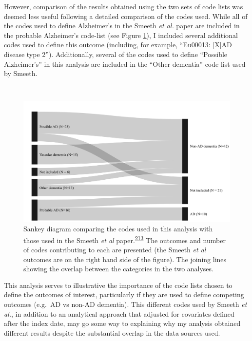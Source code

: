 \documentclass[a4paper, twoside]{templates/ociamthesis}
\begin{document}
However, comparison of the results obtained using the two sets of code lists was deemed less useful following a detailed comparison of the codes used. While all of the codes used to define Alzheimer's in the Smeeth \emph{et al.} paper are included in the probable Alzheimer's code-list (see Figure \ref{fig:smeethComparison}), I included several additional codes used to define this outcome (including, for example, ``Eu00013: {[}X{]}AD disease type 2''). Additionally, several of the codes used to define ``Possible Alzheimer's'' in this analysis are included in the ``Other dementia'' code list used by Smeeth.

~





\begin{figure}[H]
\includegraphics[width=1\linewidth]{figures/cprd-analysis/sankey_diagram} \caption[Comparison of code used in this analysis with those used in the Smeeth et al.~2010 paper]{Sankey diagram comparing the codes used in this analysis with those used in the Smeeth \emph{et al} paper.\textsuperscript{\protect\hyperlink{ref-smeeth2009}{213}} The outcomes and number of codes contributing to each are presented (the Smeeth \emph{et al} outcomes are on the right hand side of the figure). The joining lines showing the overlap between the categories in the two analyses.}\label{fig:smeethComparison}
\end{figure}

This analysis serves to illustrative the importance of the code lists chosen to define the outcomes of interest, particularly if they are used to define competing outcomes (e.g.~AD vs non-AD dementia). This different codes used by Smeeth \emph{et al.}, in addition to an analytical approach that adjusted for covariates defined after the index date, may go some way to explaining why my analysis obtained different results despite the substantial overlap in the data sources used.
\end{document}
